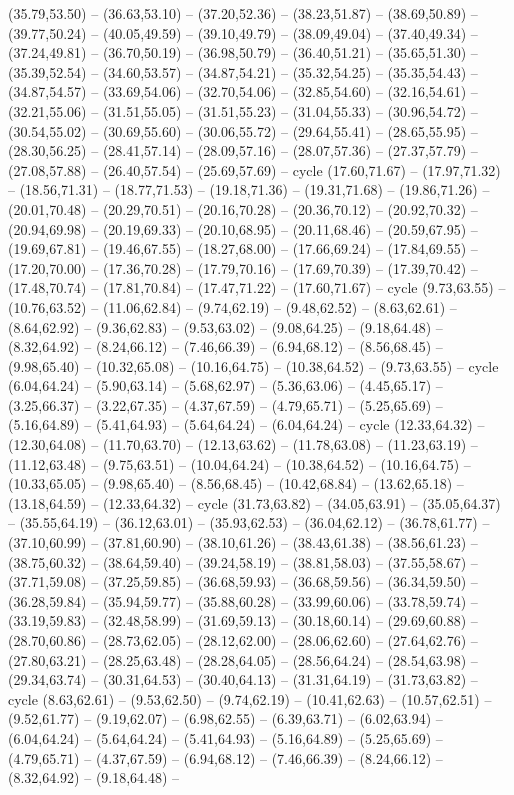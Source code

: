 {(35.79,53.50) -- (36.63,53.10) -- (37.20,52.36) -- (38.23,51.87) -- (38.69,50.89) -- (39.77,50.24) -- (40.05,49.59) -- (39.10,49.79) -- (38.09,49.04) -- (37.40,49.34) -- (37.24,49.81) -- (36.70,50.19) -- (36.98,50.79) -- (36.40,51.21) -- (35.65,51.30) -- (35.39,52.54) -- (34.60,53.57) -- (34.87,54.21) -- (35.32,54.25) -- (35.35,54.43) -- (34.87,54.57) -- (33.69,54.06) -- (32.70,54.06) -- (32.85,54.60) -- (32.16,54.61) -- (32.21,55.06) -- (31.51,55.05) -- (31.51,55.23) -- (31.04,55.33) -- (30.96,54.72) -- (30.54,55.02) -- (30.69,55.60) -- (30.06,55.72) -- (29.64,55.41) -- (28.65,55.95) -- (28.30,56.25) -- (28.41,57.14) -- (28.09,57.16) -- (28.07,57.36) -- (27.37,57.79) -- (27.08,57.88) -- (26.40,57.54) -- (25.69,57.69) -- cycle (17.60,71.67) -- (17.97,71.32) -- (18.56,71.31) -- (18.77,71.53) -- (19.18,71.36) -- (19.31,71.68) -- (19.86,71.26) -- (20.01,70.48) -- (20.29,70.51) -- (20.16,70.28) -- (20.36,70.12) -- (20.92,70.32) -- (20.94,69.98) -- (20.19,69.33) -- (20.10,68.95) -- (20.11,68.46) -- (20.59,67.95) -- (19.69,67.81) -- (19.46,67.55) -- (18.27,68.00) -- (17.66,69.24) -- (17.84,69.55) -- (17.20,70.00) -- (17.36,70.28) -- (17.79,70.16) -- (17.69,70.39) -- (17.39,70.42) -- (17.48,70.74) -- (17.81,70.84) -- (17.47,71.22) -- (17.60,71.67) -- cycle (9.73,63.55) -- (10.76,63.52) -- (11.06,62.84) -- (9.74,62.19) -- (9.48,62.52) -- (8.63,62.61) -- (8.64,62.92) -- (9.36,62.83) -- (9.53,63.02) -- (9.08,64.25) -- (9.18,64.48) -- (8.32,64.92) -- (8.24,66.12) -- (7.46,66.39) -- (6.94,68.12) -- (8.56,68.45) -- (9.98,65.40) -- (10.32,65.08) -- (10.16,64.75) -- (10.38,64.52) -- (9.73,63.55) -- cycle (6.04,64.24) -- (5.90,63.14) -- (5.68,62.97) -- (5.36,63.06) -- (4.45,65.17) -- (3.25,66.37) -- (3.22,67.35) -- (4.37,67.59) -- (4.79,65.71) -- (5.25,65.69) -- (5.16,64.89) -- (5.41,64.93) -- (5.64,64.24) -- (6.04,64.24) -- cycle (12.33,64.32) -- (12.30,64.08) -- (11.70,63.70) -- (12.13,63.62) -- (11.78,63.08) -- (11.23,63.19) -- (11.12,63.48) -- (9.75,63.51) -- (10.04,64.24) -- (10.38,64.52) -- (10.16,64.75) -- (10.33,65.05) -- (9.98,65.40) -- (8.56,68.45) -- (10.42,68.84) -- (13.62,65.18) -- (13.18,64.59) -- (12.33,64.32) -- cycle (31.73,63.82) -- (34.05,63.91) -- (35.05,64.37) -- (35.55,64.19) -- (36.12,63.01) -- (35.93,62.53) -- (36.04,62.12) -- (36.78,61.77) -- (37.10,60.99) -- (37.81,60.90) -- (38.10,61.26) -- (38.43,61.38) -- (38.56,61.23) -- (38.75,60.32) -- (38.64,59.40) -- (39.24,58.19) -- (38.81,58.03) -- (37.55,58.67) -- (37.71,59.08) -- (37.25,59.85) -- (36.68,59.93) -- (36.68,59.56) -- (36.34,59.50) -- (36.28,59.84) -- (35.94,59.77) -- (35.88,60.28) -- (33.99,60.06) -- (33.78,59.74) -- (33.19,59.83) -- (32.48,58.99) -- (31.69,59.13) -- (30.18,60.14) -- (29.69,60.88) -- (28.70,60.86) -- (28.73,62.05) -- (28.12,62.00) -- (28.06,62.60) -- (27.64,62.76) -- (27.80,63.21) -- (28.25,63.48) -- (28.28,64.05) -- (28.56,64.24) -- (28.54,63.98) -- (29.34,63.74) -- (30.31,64.53) -- (30.40,64.13) -- (31.31,64.19) -- (31.73,63.82) -- cycle (8.63,62.61) -- (9.53,62.50) -- (9.74,62.19) -- (10.41,62.63) -- (10.57,62.51) -- (9.52,61.77) -- (9.19,62.07) -- (6.98,62.55) -- (6.39,63.71) -- (6.02,63.94) -- (6.04,64.24) -- (5.64,64.24) -- (5.41,64.93) -- (5.16,64.89) -- (5.25,65.69) -- (4.79,65.71) -- (4.37,67.59) -- (6.94,68.12) -- (7.46,66.39) -- (8.24,66.12) -- (8.32,64.92) -- (9.18,64.48) -- }
